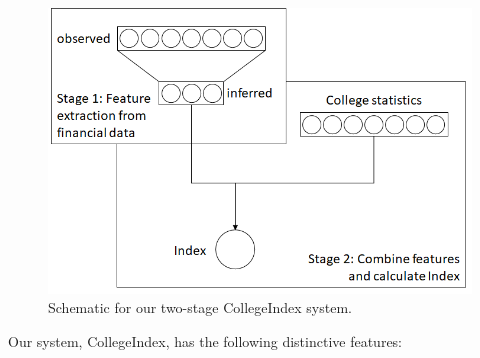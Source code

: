 \documentclass[11pt,letter]{article}
\begin{document}
\begin{figure}[H]
\centering
\includegraphics[width=0.5\linewidth]{pipeline3}
\caption{Schematic for our two-stage CollegeIndex system. } \label{fig:pipeline}
\end{figure}




Our system, CollegeIndex, has the following distinctive features:
\end{document}
